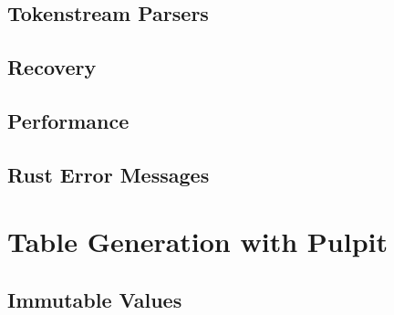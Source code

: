 \subsection{Tokenstream Parsers}



\subsection{Recovery}

\subsection{Performance}

\subsection{Rust Error Messages}



\section{Table Generation with Pulpit}

\subsection{Immutable Values}


